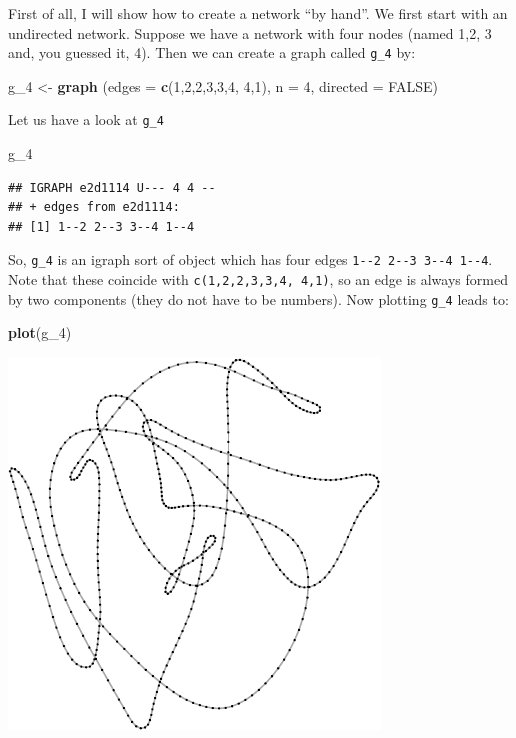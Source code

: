 \documentclass[]{article}
\newenvironment{Shaded}{\begin{snugshade}}{\end{snugshade}}
\newcommand{\KeywordTok}[1]{\textcolor[rgb]{0.13,0.29,0.53}{\textbf{#1}}}
\newcommand{\DataTypeTok}[1]{\textcolor[rgb]{0.13,0.29,0.53}{#1}}
\newcommand{\DecValTok}[1]{\textcolor[rgb]{0.00,0.00,0.81}{#1}}
\newcommand{\StringTok}[1]{\textcolor[rgb]{0.31,0.60,0.02}{#1}}
\newcommand{\OtherTok}[1]{\textcolor[rgb]{0.56,0.35,0.01}{#1}}
\newcommand{\NormalTok}[1]{#1}
\theoremstyle{definition}
\theoremstyle{definition}
\theoremstyle{definition}
\theoremstyle{remark}
\begin{document}
First of all, I will show how to create a network ``by hand''. We first
start with an undirected network. Suppose we have a network with four
nodes (named 1,2, 3 and, you guessed it, 4). Then we can create a graph
called \texttt{g\_4} by:

\begin{Shaded}
\begin{Highlighting}[]
\NormalTok{g_}\DecValTok{4}\NormalTok{ <-}\StringTok{ }\KeywordTok{graph}\NormalTok{ (}\DataTypeTok{edges =} \KeywordTok{c}\NormalTok{(}\DecValTok{1}\NormalTok{,}\DecValTok{2}\NormalTok{,}\DecValTok{2}\NormalTok{,}\DecValTok{3}\NormalTok{,}\DecValTok{3}\NormalTok{,}\DecValTok{4}\NormalTok{, }\DecValTok{4}\NormalTok{,}\DecValTok{1}\NormalTok{), }\DataTypeTok{n =} \DecValTok{4}\NormalTok{, }\DataTypeTok{directed =} \OtherTok{FALSE}\NormalTok{)}
\end{Highlighting}
\end{Shaded}

Let us have a look at \texttt{g\_4}

\begin{Shaded}
\begin{Highlighting}[]
\NormalTok{g_}\DecValTok{4}
\end{Highlighting}
\end{Shaded}

\begin{verbatim}
## IGRAPH e2d1114 U--- 4 4 -- 
## + edges from e2d1114:
## [1] 1--2 2--3 3--4 1--4
\end{verbatim}

So, \texttt{g\_4} is an igraph sort of object which has four edges
\texttt{1-\/-2\ 2-\/-3\ 3-\/-4\ 1-\/-4}. Note that these coincide with
\texttt{c(1,2,2,3,3,4,\ 4,1)}, so an edge is always formed by two
components (they do not have to be numbers). Now plotting \texttt{g\_4}
leads to:

\begin{Shaded}
\begin{Highlighting}[]
\KeywordTok{plot}\NormalTok{(g_}\DecValTok{4}\NormalTok{)}
\end{Highlighting}
\end{Shaded}

\includegraphics{ResearchTools_files/figure-latex/unnamed-chunk-53-1.pdf}
\end{document}
